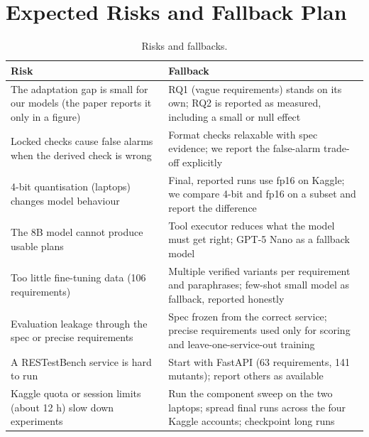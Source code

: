 \documentclass[11pt,a4paper]{article}
\begin{document}
\section{Expected Risks and Fallback Plan}
\begin{table}[H]
\centering\small
\begin{tabularx}{\linewidth}{@{}LL@{}}
\toprule
\textbf{Risk} & \textbf{Fallback}\\
\midrule
The adaptation gap is small for our models (the paper reports it only in a figure) & RQ1 (vague requirements) stands on its own; RQ2 is reported as measured, including a small or null effect\\
Locked checks cause false alarms when the derived check is wrong & Format checks relaxable with spec evidence; we report the false-alarm trade-off explicitly\\
4-bit quantisation (laptops) changes model behaviour & Final, reported runs use fp16 on Kaggle; we compare 4-bit and fp16 on a subset and report the difference\\
The 8B model cannot produce usable plans & Tool executor reduces what the model must get right; GPT-5 Nano as a fallback model\\
Too little fine-tuning data (106 requirements) & Multiple verified variants per requirement and paraphrases; few-shot small model as fallback, reported honestly\\
Evaluation leakage through the spec or precise requirements & Spec frozen from the correct service; precise requirements used only for scoring and leave-one-service-out training\\
A RESTestBench service is hard to run & Start with FastAPI (63 requirements, 141 mutants); report others as available\\
Kaggle quota or session limits (about 12 h) slow down experiments & Run the component sweep on the two laptops; spread final runs across the four Kaggle accounts; checkpoint long runs\\
\bottomrule
\end{tabularx}
\caption{Risks and fallbacks.}
\end{table}
\end{document}
